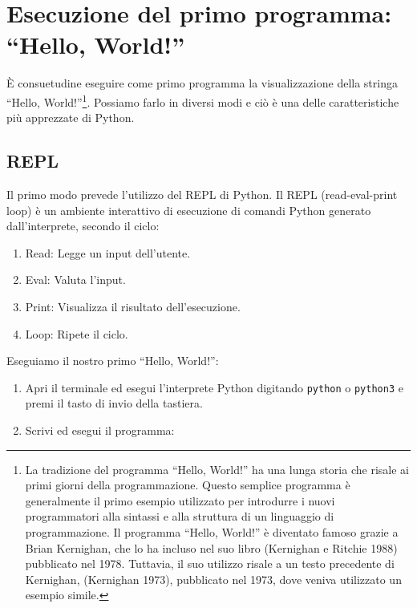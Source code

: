 \documentclass[
  letterpaper,
]{scrbook}
\begin{document}
\section{Esecuzione del primo programma: ``Hello,
World!''}\label{esecuzione-del-primo-programma-hello-world}

È consuetudine eseguire come primo programma la visualizzazione della
stringa ``Hello, World!''\footnote{La tradizione del programma ``Hello,
  World!'' ha una lunga storia che risale ai primi giorni della
  programmazione. Questo semplice programma è generalmente il primo
  esempio utilizzato per introdurre i nuovi programmatori alla sintassi
  e alla struttura di un linguaggio di programmazione. Il programma
  ``Hello, World!'' è diventato famoso grazie a Brian Kernighan, che lo
  ha incluso nel suo libro (Kernighan e Ritchie 1988) pubblicato nel
  1978. Tuttavia, il suo utilizzo risale a un testo precedente di
  Kernighan, (Kernighan 1973), pubblicato nel 1973, dove veniva
  utilizzato un esempio simile.}. Possiamo farlo in diversi modi e ciò è
una delle caratteristiche più apprezzate di Python.

\subsection{REPL}\label{repl}

Il primo modo prevede l'utilizzo del REPL di Python. Il REPL
(read-eval-print loop) è un ambiente interattivo di esecuzione di
comandi Python generato dall'interprete, secondo il ciclo:

\begin{enumerate}
\def\labelenumi{\arabic{enumi}.}
\item
  Read: Legge un input dell'utente.
\item
  Eval: Valuta l'input.
\item
  Print: Visualizza il risultato dell'esecuzione.
\item
  Loop: Ripete il ciclo.
\end{enumerate}

Eseguiamo il nostro primo ``Hello, World!'':

\begin{enumerate}
\def\labelenumi{\arabic{enumi}.}
\item
  Apri il terminale ed esegui l'interprete Python digitando
  \texttt{python} o \texttt{python3} e premi il tasto di invio della
  tastiera.
\item
  Scrivi ed esegui il programma:
\end{enumerate}
\end{document}
